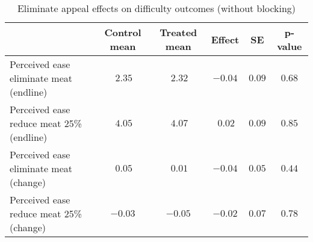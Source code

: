 \begin{table*}[ht]
\caption{Eliminate appeal effects on difficulty outcomes (without blocking)\label{round}} 
\begin{center}
\begin{tabular}{lccccc}
\hline\hline
\multicolumn{1}{l}{}&\multicolumn{1}{c}{Control mean}&\multicolumn{1}{c}{Treated mean}&\multicolumn{1}{c}{Effect}&\multicolumn{1}{c}{SE}&\multicolumn{1}{c}{p-value}\tabularnewline
\hline
Perceived ease eliminate meat (endline)&$~2.35$&$~2.32$&$-0.04$&$0.09$&$0.68$\tabularnewline
Perceived ease reduce meat 25\% (endline)&$~4.05$&$~4.07$&$~0.02$&$0.09$&$0.85$\tabularnewline
Perceived ease eliminate meat (change)&$~0.05$&$~0.01$&$-0.04$&$0.05$&$0.44$\tabularnewline
Perceived ease reduce meat 25\% (change)&$-0.03$&$-0.05$&$-0.02$&$0.07$&$0.78$\tabularnewline
\hline
\end{tabular}\end{center}

\end{table*}
